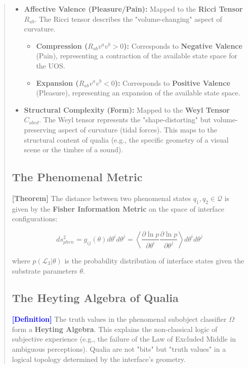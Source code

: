 \documentclass[11pt,titlepage]{article}
\newcommand{\interface}{\mathcal{L}_3}
\newcommand{\classifier}{\Omega}
\newcommand{\tagdef}{\textcolor{blue}{\textbf{[Definition]}} }
\newcommand{\tagtheo}{\textcolor{green!60!black}{\textbf{[Theorem]}} }
\begin{document}
\begin{abstract}
\begin{itemize}
    
\item \textbf{Affective Valence (Pleasure/Pain):} Mapped to the \textbf{Ricci Tensor} $R_{ab}$. The Ricci tensor describes the "volume-changing" aspect of curvature.
    \begin{itemize}
        
\item \textbf{Compression ($R_{ab} v^a v^b > 0$):} Corresponds to \textbf{Negative Valence} (Pain), representing a contraction of the available state space for the UOS.
        
\item \textbf{Expansion ($R_{ab} v^a v^b < 0$):} Corresponds to \textbf{Positive Valence} (Pleasure), representing an expansion of the available state space.
    \end{itemize}
    
    
\item \textbf{Structural Complexity (Form):} Mapped to the \textbf{Weyl Tensor} $C_{abcd}$. The Weyl tensor represents the "shape-distorting" but volume-preserving aspect of curvature (tidal forces). This maps to the structural content of qualia (e.g., the specific geometry of a visual scene or the timbre of a sound).
\end{itemize}

\subsection{The Phenomenal Metric}
\tagtheo The distance between two phenomenal states $q_1, q_2 \in \mathcal{Q}$ is given by the \textbf{Fisher Information Metric} on the space of interface configurations:

\begin{equation}
ds^2_{phen} = g_{ij}(\theta) d\theta^i d\theta^j = \left\langle \frac{\partial \ln p}{\partial \theta^i} \frac{\partial \ln p}{\partial \theta^j} \right\rangle d\theta^i d\theta^j
\end{equation}

where $p(\interface | \theta)$ is the probability distribution of interface states given the substrate parameters $\theta$.

\subsection{The Heyting Algebra of Qualia}
\tagdef The truth values in the phenomenal subobject classifier $\classifier$ form a \textbf{Heyting Algebra}. This explains the non-classical logic of subjective experience (e.g., the failure of the Law of Excluded Middle in ambiguous perceptions). Qualia are not "bits" but "truth values" in a logical topology determined by the interface's geometry.



\end{abstract}
\end{document}
